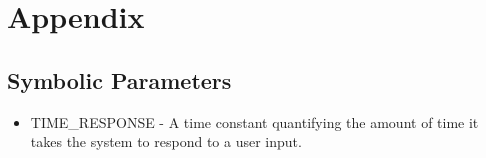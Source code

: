 \documentclass[12pt, titlepage]{article}
\begin{document}




\newpage

\section{Appendix}

\subsection{Symbolic Parameters}

\begin{itemize}
    \item TIME\_RESPONSE - A time constant quantifying the amount of time it takes the system to respond to a user input.
\end{itemize}
\end{document}
